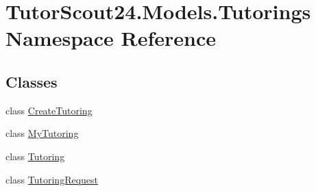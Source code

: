 \hypertarget{namespace_tutor_scout24_1_1_models_1_1_tutorings}{}\section{Tutor\+Scout24.\+Models.\+Tutorings Namespace Reference}
\label{namespace_tutor_scout24_1_1_models_1_1_tutorings}
\subsection*{Classes}
\begin{DoxyCompactItemize}
\item 
class \mbox{\hyperlink{class_tutor_scout24_1_1_models_1_1_tutorings_1_1_create_tutoring}{Create\+Tutoring}}
\item 
class \mbox{\hyperlink{class_tutor_scout24_1_1_models_1_1_tutorings_1_1_my_tutoring}{My\+Tutoring}}
\item 
class \mbox{\hyperlink{class_tutor_scout24_1_1_models_1_1_tutorings_1_1_tutoring}{Tutoring}}
\item 
class \mbox{\hyperlink{class_tutor_scout24_1_1_models_1_1_tutorings_1_1_tutoring_request}{Tutoring\+Request}}
\end{DoxyCompactItemize}
